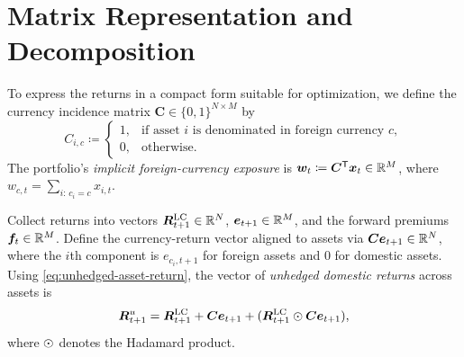 \section{Matrix Representation and Decomposition}

To express the returns in a compact form suitable for optimization, we define the currency incidence matrix $\bm{C}\in\{0,1\}^{N\times M}$ by
\begin{equation*}
C_{i,c} \coloneqq
\begin{cases}
1, & \text{if asset $i$ is denominated in foreign currency $c$},\\
0, & \text{otherwise}.
\end{cases}
\end{equation*}
The portfolio's \emph{implicit foreign-currency exposure} is $\bm{w}_t \coloneqq \bm{C}^{\mathsf{T}} \bm{x}_t \in \mathbb{R}^M$, where $w_{c,t} = \sum_{i:\,c_i=c} x_{i,t}$.

Collect returns into vectors $\bm{R}^{\text{LC}}_{t+1} \in \mathbb{R}^N$, $\bm{e}_{t+1} \in \mathbb{R}^M$, and the forward premiums $\bm{f}_t \in \mathbb{R}^M$. Define the currency-return vector aligned to assets via $\bm{C}\bm{e}_{t+1}\in\mathbb{R}^N$, where the $i$th component is $e_{c_i,t+1}$ for foreign assets and $0$ for domestic assets. Using \eqref{eq:unhedged-asset-return}, the vector of \emph{unhedged domestic returns} across assets is
\begin{equation*}
\bm{R}^{u}_{t+1}
=
\bm{R}^{\text{LC}}_{t+1}
+
\bm{C}\bm{e}_{t+1}
+
(\bm{R}^{\text{LC}}_{t+1}\odot\bm{C}\bm{e}_{t+1}),
\end{equation*}
where $\odot$ denotes the Hadamard product. 

